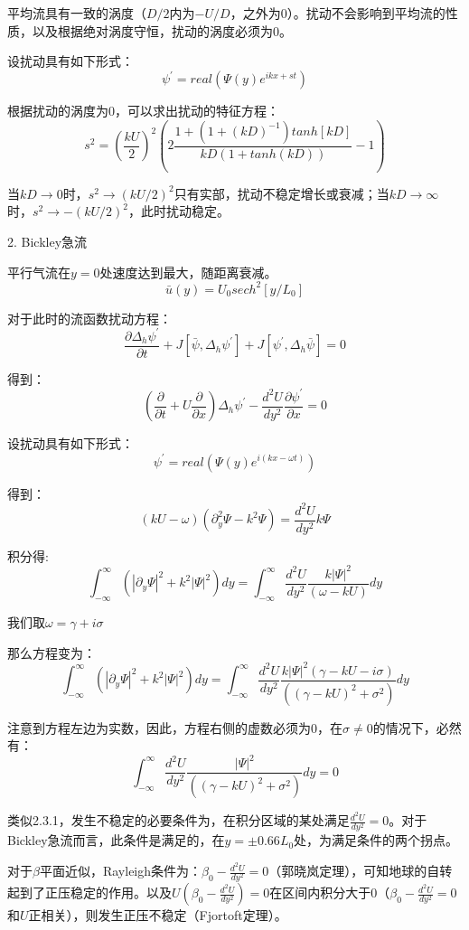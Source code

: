\documentclass{article}
\begin{document}
平均流具有一致的涡度（$D/2$内为$-U/D$，之外为$0$）。扰动不会影响到平均流的性质，以及根据绝对涡度守恒，扰动的涡度必须为$0$。

设扰动具有如下形式：
$$\psi^{\prime}=real\left(\Psi(y)e^{ikx+st}\right)$$

根据扰动的涡度为$0$，可以求出扰动的特征方程：
$$s^2=\left(\frac{kU}{2}\right)^2\left(2\frac{1+(1+(kD)^{-1})tanh[kD]}{kD(1+tanh(kD))}-1\right)$$

当$kD\rightarrow0$时，$s^2\rightarrow(kU/2)^2$只有实部，扰动不稳定增长或衰减；当$kD \rightarrow \infty$时，$s^2 \rightarrow -(kU/2)^2$，此时扰动稳定。

2. Bickley急流

平行气流在$y=0$处速度达到最大，随距离衰减。
$$\bar{u}(y) = U_0sech^2[y/L_0]$$

对于此时的流函数扰动方程：
$$\frac{\partial\Delta_h\psi^{\prime}}{\partial t} + J[\bar{\psi}, \Delta_h\psi^{\prime}] +J[\psi^{\prime}, \Delta_h\bar{\psi}] = 0$$

得到：
$$(\frac{\partial}{\partial t}+U\frac{\partial}{\partial x})\Delta_h\psi^{\prime}-\frac{d^2U}{dy^2}\frac{\partial\psi^{\prime}}{\partial x} = 0$$

设扰动具有如下形式：
$$\psi^{\prime}=real\left(\Psi(y)e^{i(kx-\omega t)}\right)$$

得到：
$$(kU-\omega)(\partial_y^2\Psi-k^2\Psi)=\frac{d^2U}{dy^2}k\Psi$$

积分得:
$$\int_{-\infty}^{\infty}(|\partial_y\Psi|^2+k^2|\Psi|^2)dy=\int_{-\infty}^{\infty}\frac{d^2U}{dy^2}\frac{k|\Psi|^2}{(\omega-kU)} dy$$

我们取$\omega = \gamma + i\sigma$

那么方程变为：
$$\int_{-\infty}^{\infty}(|\partial_y\Psi|^2+k^2|\Psi|^2)dy=\int_{-\infty}^{\infty}\frac{d^2U}{dy^2}\frac{k|\Psi|^2(\gamma-kU-i\sigma)}{((\gamma-kU)^2+\sigma^2)} dy$$

注意到方程左边为实数，因此，方程右侧的虚数必须为0，在$\sigma\ne0$的情况下，必然有：
$$\int_{-\infty}^{\infty}\frac{d^2U}{dy^2}\frac{|\Psi|^2}{((\gamma-kU)^2+\sigma^2)} dy = 0$$

类似2.3.1，发生不稳定的必要条件为，在积分区域的某处满足$\frac{d^2U}{dy^2}=0$。对于Bickley急流而言，此条件是满足的，在$y= \pm 0.66L_0$处，为满足条件的两个拐点。

对于$\beta$平面近似，Rayleigh条件为：$\beta_0-\frac{d^2U}{dy^2}=0$（郭晓岚定理），可知地球的自转起到了正压稳定的作用。以及$U(\beta_0-\frac{d^2U}{dy^2})=0$在区间内积分大于0（$\beta_0-\frac{d^2U}{dy^2}=0$和$U$正相关），则发生正压不稳定（Fjortoft定理）。
\end{document}
